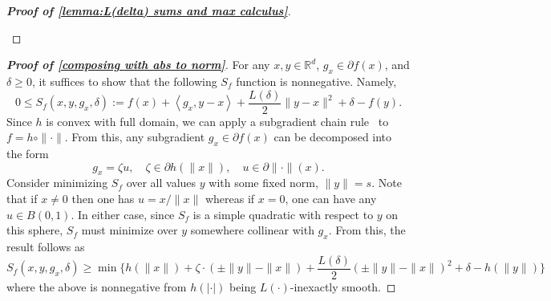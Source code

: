 \documentclass[11pt, hidelinks]{article}
\numberwithin{equation}{section}
\theoremstyle{thmstyletwo}%
\numberwithin{equation}{section}
\newcommand{\R}{\mathbb{R}}
\newcommand{\inner}[2]{\left\langle {#1}, {#2} \right\rangle}
\begin{document}
\begin{proof}[\bf Proof of \cref{lemma:L(delta) sums and max calculus}]
\begin{enumerate}
    \end{enumerate}
\end{proof}



\begin{proof}[\bf Proof of \cref{composing with abs to norm}]
    For any $x, y \in \R^d$, $g_x \in \partial f(x)$, and $\delta \geq 0$, it suffices to show that the following $S_f$ function is nonnegative. Namely, 
    $$0 \leq S_f(x,y,g_x,\delta) := f(x) + \inner{g_x}{y-x} + \frac{L(\delta)}{2}\|y-x\|^2 + \delta - f(y).$$
    Since $h$ is convex with full domain, we can apply a subgradient chain rule~\cite[Corollary 16.72]{bauschke} to $f=h\circ\|\cdot\|$. From this, any subgradient $g_x\in\partial f(x)$ can be decomposed into the form
    $$g_x = \zeta u, \quad \zeta \in \partial h(\|x\|), \quad u \in \partial \|\cdot\|(x).$$
    Consider minimizing $S_f$ over all values $y$ with some fixed norm, $\|y\| = s$. Note that if $x \ne 0$ then one has $u = x/\|x\|$ whereas if $x = 0$, one can have any $u \in B(0,1)$. In either case, since $S_f$ is a simple quadratic with respect to $y$ on this sphere, $S_f$ must minimize over $y$ somewhere collinear with $g_x$. From this, the result follows as $$S_f(x,y,g_x, \delta) \geq \min \{h(\|x\|)+\zeta\cdot(\pm \|y\|-\|x\|)+\frac{L(\delta)}{2}(\pm\|y\|-\|x\|)^2+\delta-h(\|y\|) \}$$ where the above is nonnegative from $h(|\cdot|)$ being $L(\cdot)$-inexactly smooth.
\end{proof}
\end{document}
